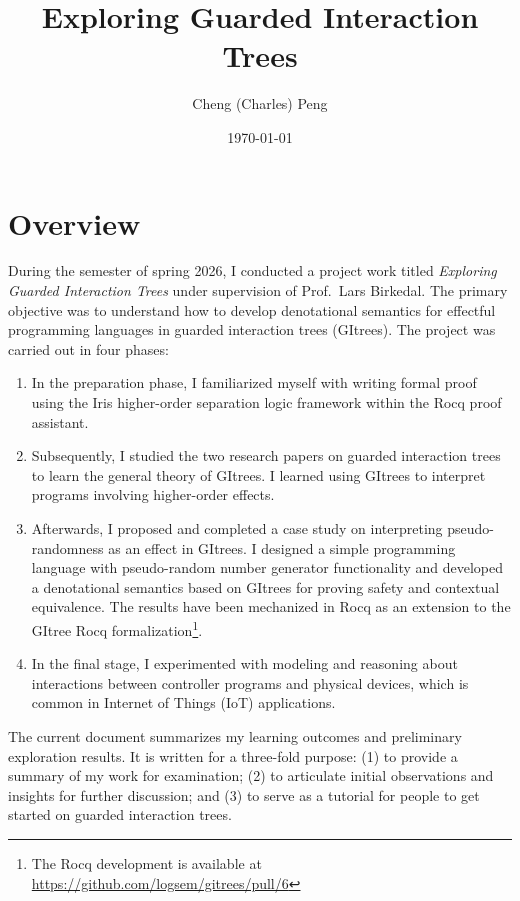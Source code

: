 \documentclass{article}
\title{Exploring Guarded Interaction Trees}
\author{Cheng (Charles) Peng}
\date{\today}
\theoremstyle{definition}
\theoremstyle{plain}
\theoremstyle{remark}
\begin{document}
\maketitle{}

\section{Overview}

During the semester of spring 2026, I conducted a project work titled \emph{Exploring Guarded Interaction Trees} under supervision of Prof.~Lars Birkedal. The primary objective was to understand how to develop denotational semantics for effectful programming languages in guarded interaction trees (GItrees).
The project was carried out in four phases:
\begin{enumerate}
  \item In the preparation phase, I familiarized myself with writing formal proof using the Iris higher-order separation logic framework within the Rocq proof assistant.
  \item Subsequently, I studied the two research papers on guarded interaction trees~\cite{esop25git-callcc,popl24gitree} to learn the general theory of GItrees. I learned using GItrees to interpret programs involving higher-order effects.
  \item Afterwards, I proposed and completed a case study on interpreting pseudo-randomness as an effect in GItrees. I designed a simple programming language with pseudo-random number generator functionality and developed a denotational semantics based on GItrees for proving safety and contextual equivalence.
    The results have been mechanized in Rocq as an extension to the GItree Rocq formalization\footnote{The Rocq development is available at \url{https://github.com/logsem/gitrees/pull/6}}.
  \item In the final stage, I experimented with modeling and reasoning about interactions between controller programs and physical devices, which is common in Internet of Things (IoT) applications.
\end{enumerate}

The current document summarizes my learning outcomes and preliminary exploration results. It is written for a three-fold purpose:
(1) to provide a summary of my work for examination;
(2) to articulate initial observations and insights for further discussion; and
(3) to serve as a tutorial for people to get started on guarded interaction trees.\par
\end{document}
